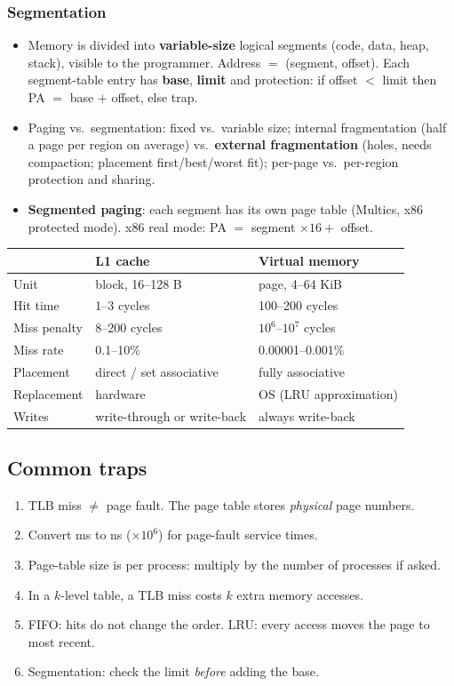 \subsubsection{Segmentation}
\begin{itemize}[leftmargin=*]
  \item Memory is divided into \textbf{variable-size} logical segments (code, data,
  heap, stack), visible to the programmer. Address $=$ (segment, offset). Each
  segment-table entry has \textbf{base}, \textbf{limit} and protection:
  if offset $<$ limit then PA $=$ base $+$ offset, else trap.
  \item Paging vs.\ segmentation: fixed vs.\ variable size; internal fragmentation
  (half a page per region on average) vs.\ \textbf{external fragmentation} (holes,
  needs compaction; placement first/best/worst fit); per-page vs.\ per-region
  protection and sharing.
  \item \textbf{Segmented paging}: each segment has its own page table (Multics,
  x86 protected mode). x86 real mode: PA $=$ segment $\times16+$ offset.
\end{itemize}

\begin{center}
\small
\begin{tabular}{@{}lll@{}}
\toprule
& L1 cache & Virtual memory \\
\midrule
Unit & block, 16--128 B & page, 4--64 KiB \\
Hit time & 1--3 cycles & 100--200 cycles \\
Miss penalty & 8--200 cycles & $10^6$--$10^7$ cycles \\
Miss rate & 0.1--10\% & 0.00001--0.001\% \\
Placement & direct / set associative & fully associative \\
Replacement & hardware & OS (LRU approximation) \\
Writes & write-through or write-back & always write-back \\
\bottomrule
\end{tabular}
\end{center}

\subsection{Common traps}
\begin{enumerate}[leftmargin=*]
  \item TLB miss $\neq$ page fault. The page table stores \emph{physical} page
  numbers.
  \item Convert ms to ns ($\times10^6$) for page-fault service times.
  \item Page-table size is per process: multiply by the number of processes if asked.
  \item In a $k$-level table, a TLB miss costs $k$ extra memory accesses.
  \item FIFO: hits do not change the order. LRU: every access moves the page to most
  recent.
  \item Segmentation: check the limit \emph{before} adding the base.
\end{enumerate}

